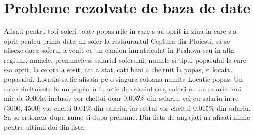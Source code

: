 \documentclass[12pt, a4paper]{article}
\begin{document}
\section{Probleme rezolvate de baza de date}

Afisati pentru toti soferi toate popasurile in care s-au oprit in ziua in care
s-a oprit pentru prima data un sofer la restaurantul Ceptura din Ploiesti, sa
se afiseze daca soferul a venit cu un camion inmatriculat in Prahova sau in
alta regiune, numele, prenumele si salariul soferului, numele si tipul
popasului la care s-a oprit, la ce ora a sosit, cat a stat, cati bani a
cheltuit la popas, si locatia popasului. Locatia sa fie afisata pe o singura
coloana numita Locatie popas. Un sofer cheltuieste la un popas in functie de
salariul sau, soferii cu un salariu mai mic de 3000lei inclusiv vor cheltui doar
0.005\% din salariu, cei cu salariu intre (3000, 4500] vor chelui 0.01\% din
salariu, iar restul vor cheltui 0.015\% din salariu. Sa se ordoneze dupa nume
si dupa prenume. Din lista de angajati nu afisati nimic pentru ultimii doi din lista.
\end{document}
